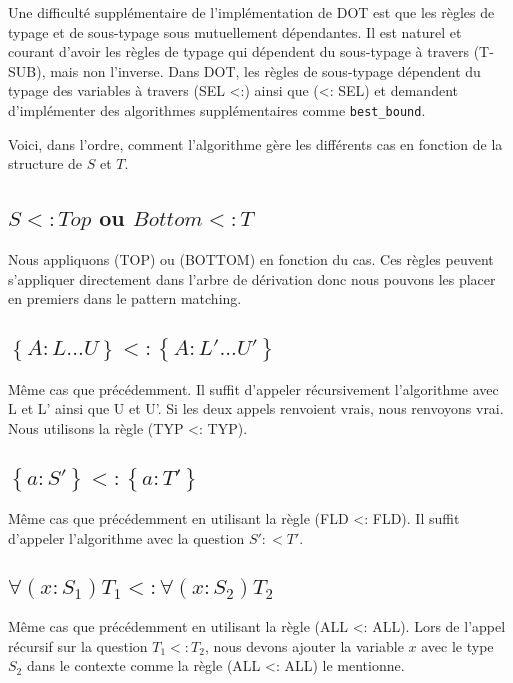 Une difficulté supplémentaire de l'implémentation de DOT est que les règles de
typage et de sous-typage sous mutuellement dépendantes. Il est naturel et
courant d'avoir les règles de typage qui dépendent du sous-typage à travers
(T-SUB), mais non l'inverse. Dans DOT, les règles de sous-typage dépendent du
typage des variables à travers (SEL <:) ainsi que (<: SEL) et demandent
d'implémenter des algorithmes supplémentaires comme \verb|best_bound|.

Voici, dans l'ordre,
comment l'algorithme gère les différents cas en fonction de la structure de $S$
et $T$.

\subsection*{$S <: Top$ ou $Bottom <: T$}

Nous appliquons (TOP) ou (BOTTOM) en fonction du cas. Ces règles peuvent
s'appliquer directement dans l'arbre de dérivation donc nous pouvons les placer
en premiers dans le pattern matching.

\subsection*{$\left\{ A : L ... U \right\} <: \left\{ A : L' ... U' \right\}$}

Même cas que précédemment. Il suffit d'appeler récursivement l'algorithme avec L
et L' ainsi que U et U'. Si les deux appels renvoient vrais, nous renvoyons
vrai. Nous utilisons la règle (TYP <: TYP).

\subsection*{$\left\{ a : S' \right\} <: \left\{ a : T' \right\}$}

Même cas que précédemment en utilisant la règle (FLD <: FLD). Il suffit
d'appeler l'algorithme avec la question $S' :< T'$.

\subsection*{$\forall(x : S_{1}) T_{1} <: \forall(x : S_{2}) T_{2}$}

Même cas que précédemment en utilisant la règle (ALL <: ALL). Lors de l'appel
récursif sur la question $T_{1} <: T_{2}$, nous devons ajouter la variable $x$
avec le type $S_{2}$ dans le contexte comme la règle (ALL <: ALL) le mentionne.

